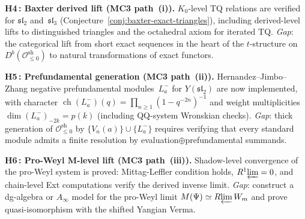 \begin{remark}
\smallskip\noindent
\textbf{H4\,: Baxter derived lift (MC3 path~\textup{(i)}).}
$K_0$-level TQ relations are verified for
$\mathfrak{sl}_2$ and~$\mathfrak{sl}_3$
(Conjecture~\ref{conj:baxter-exact-triangles}), including
derived-level lifts to distinguished triangles and the octahedral
axiom for iterated TQ.
\emph{Gap}: the categorical lift from short exact sequences in the
heart of the $t$-structure on
$D^b(\mathcal{O}^{\mathrm{sh}}_{\leq 0})$ to natural
transformations of exact functors.

\smallskip\noindent
\textbf{H5\,: Prefundamental generation (MC3 path~\textup{(ii)}).}
Hernandez--Jimbo--Zhang negative prefundamental modules~$L^-_a$
for $Y(\mathfrak{sl}_2)$ are now implemented, with character
$\operatorname{ch}(L^-_a)(q) = \prod_{n \geq 1} (1 - q^{-2n})^{-1}$
and weight multiplicities $\dim(L^-_a)_{-2k} = p(k)$
(including QQ-system Wronskian checks).
\emph{Gap}: thick generation of
$\mathcal{O}^{\mathrm{sh}}_{\leq 0}$ by
$\{V_n(a)\} \cup \{L^-_a\}$ requires verifying that every
standard module admits a finite resolution by
evaluation$\oplus$prefundamental summands.

\smallskip\noindent
\textbf{H6\,: Pro-Weyl M-level lift (MC3 path~\textup{(iii)}).}
Shadow-level convergence of the pro-Weyl system is proved:
Mittag-Leffler condition holds, $R^1\!\varprojlim = 0$, and
chain-level Ext computations verify the derived inverse limit.  \emph{Gap}: construct a dg-algebra or
$A_\infty$ model for the pro-Weyl limit
$M(\Psi) \simeq R\!\varprojlim W_m$ and prove quasi-isomorphism
with the shifted Yangian Verma.


\end{remark}
